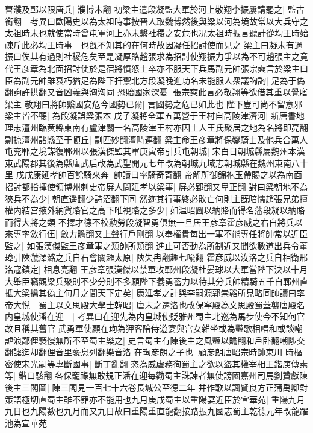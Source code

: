 曹濮及鄆以限唐兵|{
	濮博木翻}
初梁主遣段凝監大軍於河上敬翔李振屢請罷之|{
	監古銜翻　考異曰歐陽史以為太祖時事按晉人取魏博然後與梁以河為境故常以大兵守之太祖時未也就使當時曾屯軍河上亦未繫社稷之安危也况太祖時振言聽計從均王時始疎斤此必均王時事　也旣不知其的在何時故因凝任招討使而見之}
梁主曰凝未有過振曰俟其有過則社稷危矣至是凝厚賂趙張求為招討使翔振力爭以為不可趙張主之竟代王彦章為北面招討使於是宿將憤怒士卒亦不服天下兵馬副元帥張宗奭言於梁主曰臣為副元帥雖衰朽猶足為陛下扞禦北方段凝晚進功名未能服人衆議詾詾|{
	足為于偽翻訽許拱翻又音凶義與洶洶同}
恐貽國家深憂|{
	張宗奭此言必敬翔等欲借其重以覺寤梁主}
敬翔曰將帥繫國安危今國勢已爾|{
	言國勢之危已如此也}
陛下豈可尚不留意邪梁主皆不聽|{
	為段凝誤梁張本}
戊子凝將全軍五萬營于王村自高陵津濟河|{
	新唐書地理志澶州臨黄縣東南有盧津關一名高陵津王村亦因土人王氏聚居之地為名將即亮翻}
剽掠澶州諸縣至于頓丘|{
	剽匹妙翻澶時連翻}
梁主命王彦章將保鑾騎士及他兵合萬人屯兖鄆之境謀復鄆州以張漢傑監其軍庚寅帝引兵屯朝城|{
	宋白日朝城縣屬魏州本漢東武陽郡其後為縣唐武后改為武聖開元七年改為朝城九域志朝城縣在魏州東南八十里}
戊戌康延孝帥百餘騎來奔|{
	帥讀曰率騎奇寄翻}
帝解所御錦袍玉帶賜之以為南面招討都指揮使領博州刺史帝屏人問延孝以梁事|{
	屏必郢翻又卑正翻}
對曰梁朝地不為狹兵不為少|{
	朝直遥翻少詩沼翻下同}
然迹其行事終必敗亡何則主旣暗懦趙張兄弟擅權内結宫掖外納貨賂官之高下唯視賂之多少|{
	如温昭圖以納賂而得名藩段凝以納賂而得大將之類}
不擇才德不校勲勞段凝智勇俱無一旦居王彦章霍彦威之右自將兵以來專率斂行伍|{
	斂力贍翻又上聲行戶剛翻}
以奉權貴每出一軍不能專任將帥常以近臣監之|{
	如張漢傑監王彦章軍之類帥所類翻}
進止可否動為所制近又聞欲數道出兵令董璋引陜虢澤潞之兵自石會關趣太原|{
	陜失冉翻趣七喩翻}
霍彦威以汝洛之兵自相衛邢洺寇鎮定|{
	相息亮翻}
王彦章張漢傑以禁軍攻鄆州段凝杜晏球以大軍當陛下決以十月大舉臣竊觀梁兵聚則不少分則不多願陛下養勇蓄力以待其分兵帥精騎五千自鄆州直抵大梁擒其偽主旬月之間天下定矣|{
	康延孝之計與李嗣源郭崇韜所見略同帥讀曰率}
帝大悦　蜀主以文思殿大學士韓昭|{
	唐末之遷洛也改保寜殿為文思殿蜀蓋襲唐殿名}
内皇城使潘在迎　|{
	考異曰在迎先為内皇城使貶雅州蜀主北巡為馬步使今不知何官故且稱其舊官}
武勇軍使顧在珣為狎客陪侍遊宴與宫女雜坐或為豔歌相唱和或談嘲謔浪鄙俚䙝慢無所不至蜀主樂之|{
	史言蜀主有陳後主之風豔以贍翻和戶卧翻嘲陟交翻謔迄却翻俚音里䙝息列翻樂音洛}
在珣彦朗之子也|{
	顧彦朗唐昭宗時帥東川}
時樞密使宋光嗣等專斷國事|{
	斷丁亂翻}
恣為威虐務徇蜀主之欲以盜其權宰相王鍇庾傳素等|{
	鍇口駭翻}
各保寵祿無敢規正潘在迎每勸蜀主誅諫者無使謗國嘉州司馬劉贊獻陳後主三閣圖|{
	陳三閣見一百七十六卷長城公至德二年}
并作歌以諷賢良方正蒲禹卿對策語極切直蜀主雖不罪亦不能用也九月庚戌蜀主以重陽宴近臣於宣華苑|{
	重陽九月九日也九陽數也九月而又九日故曰重陽重直龍翻按路振九國志蜀主乾德元年改龍躍池為宣華苑}
